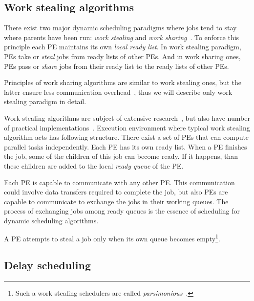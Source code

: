 \subsection{Work stealing algorithms}
\label{sec:work_stealing}

There exist two major dynamic scheduling paradigms where jobs tend to
stay where parents have been run: \emph{work stealing} and \emph{work
  sharing}~\cite{Blumofe:1999:SMC:324133.324234}. To enforce this
principle each PE maintains its own \emph{local ready list}. In work
stealing paradigm, PEs take or \emph{steal} jobs from ready lists of
other PEs. And in work sharing ones, PEs pass or \emph{share} jobs from
their ready list to the ready lists of other PEs.

Principles of work sharing algorithms are similar to work stealing
ones, but the latter ensure less communication
overhead~\cite{Blumofe:1999:SMC:324133.324234}, thus we will describe
only work stealing paradigm in detail.

Work stealing algorithms are subject of extensive
research~\cite{Spoonhower:2009:BNP:1583991.1584019,Blumofe:1999:SMC:324133.324234,Acar:2000:DLW:341800.341801,Arora:1998:TSM:277651.277678},
but also have number of practical
implementations~\cite{Halstead:1984:IML:800055.802017,Blumofe:1995:CEM:209937.209958}.
Execution environment where typical work stealing algorithm acts has
following structure. There exist a set of PEs that can compute
parallel tasks independently. Each PE has its own ready list. When a
PE finishes the job, some of the children of this job can become
ready. If it happens, than these children are added to the local
\emph{ready queue} of the PE.

Each PE is capable to communicate with any other PE. This
communication could involve data transfers required to complete the
job, but also PEs are capable to communicate to exchange the jobs in
their working queues. The process of exchanging jobs among ready
queues is the essence of scheduling for dynamic scheduling algorithms.

A PE attempts to steal a job only when its own queue becomes
empty\footnote{Such a work stealing schedulers are called
  \emph{parsimonious}~\cite{Spoonhower:2009:BNP:1583991.1584019}.}.


\subsection{Delay scheduling}
\label{sec:delay}

